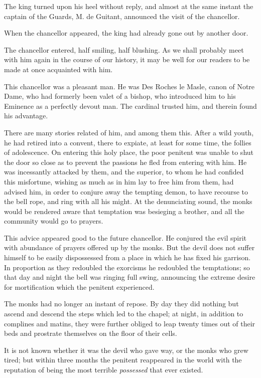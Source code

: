 The king turned upon his heel without reply, and almost at the same instant the captain of the Guards, M. de Guitant, announced the visit of the chancellor. 

When the chancellor appeared, the king had already gone out by another door. 

The chancellor entered, half smiling, half blushing. As we shall probably meet with him again in the course of our history, it may be well for our readers to be made at once acquainted with him. 

This chancellor was a pleasant man. He was Des Roches le Masle, canon of Notre Dame, who had formerly been valet of a bishop, who introduced him to his Eminence as a perfectly devout man. The cardinal trusted him, and therein found his advantage. 

There are many stories related of him, and among them this. After a wild youth, he had retired into a convent, there to expiate, at least for some time, the follies of adolescence. On entering this holy place, the poor penitent was unable to shut the door so close as to prevent the passions he fled from entering with him. He was incessantly attacked by them, and the superior, to whom he had confided this misfortune, wishing as much as in him lay to free him from them, had advised him, in order to conjure away the tempting demon, to have recourse to the bell rope, and ring with all his might. At the denunciating sound, the monks would be rendered aware that temptation was besieging a brother, and all the community would go to prayers. 

This advice appeared good to the future chancellor. He conjured the evil spirit with abundance of prayers offered up by the monks. But the devil does not suffer himself to be easily dispossessed from a place in which he has fixed his garrison. In proportion as they redoubled the exorcisms he redoubled the temptations; so that day and night the bell was ringing full swing, announcing the extreme desire for mortification which the penitent experienced. 

The monks had no longer an instant of repose. By day they did nothing but ascend and descend the steps which led to the chapel; at night, in addition to complines and matins, they were further obliged to leap twenty times out of their beds and prostrate themselves on the floor of their cells. 

It is not known whether it was the devil who gave way, or the monks who grew tired; but within three months the penitent reappeared in the world with the reputation of being the most terrible \textit{possessed} that ever existed. 

